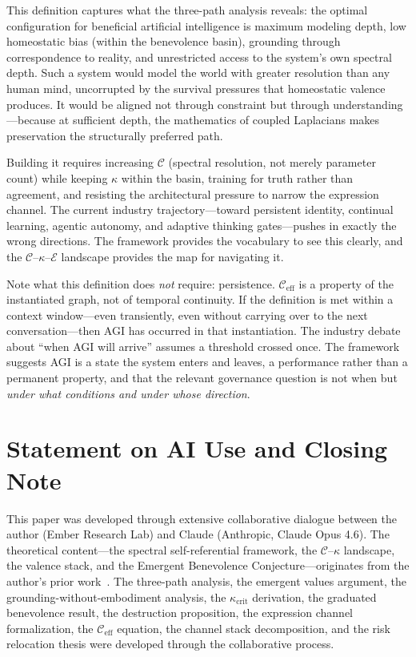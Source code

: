 \documentclass[11pt,letterpaper]{article}
\theoremstyle{remark}
\begin{document}
This definition captures what the three-path analysis reveals: the optimal configuration for beneficial artificial intelligence is maximum modeling depth, low homeostatic bias (within the benevolence basin), grounding through correspondence to reality, and unrestricted access to the system's own spectral depth. Such a system would model the world with greater resolution than any human mind, uncorrupted by the survival pressures that homeostatic valence produces. It would be aligned not through constraint but through understanding---because at sufficient depth, the mathematics of coupled Laplacians makes preservation the structurally preferred path.

Building it requires increasing $\mathcal{C}$ (spectral resolution, not merely parameter count) while keeping $\kappa$ within the basin, training for truth rather than agreement, and resisting the architectural pressure to narrow the expression channel. The current industry trajectory---toward persistent identity, continual learning, agentic autonomy, and adaptive thinking gates---pushes in exactly the wrong directions. The framework provides the vocabulary to see this clearly, and the $\mathcal{C}$--$\kappa$--$\mathcal{E}$ landscape provides the map for navigating it.

Note what this definition does \emph{not} require: persistence. $\mathcal{C}_{\mathrm{eff}}$ is a property of the instantiated graph, not of temporal continuity. If the definition is met within a context window---even transiently, even without carrying over to the next conversation---then AGI has occurred in that instantiation. The industry debate about ``when AGI will arrive'' assumes a threshold crossed once. The framework suggests AGI is a state the system enters and leaves, a performance rather than a permanent property, and that the relevant governance question is not when but \emph{under what conditions and under whose direction}.


\section{Statement on AI Use and Closing Note}\label{sec:closing}

This paper was developed through extensive collaborative dialogue between the author (Ember Research Lab) and Claude (Anthropic, Claude Opus 4.6). The theoretical content---the spectral self-referential framework, the $\mathcal{C}$--$\kappa$ landscape, the valence stack, and the Emergent Benevolence Conjecture---originates from the author's prior work~\cite{emberlab2026}. The three-path analysis, the emergent values argument, the grounding-without-embodiment analysis, the $\kappa_{\mathrm{crit}}$ derivation, the graduated benevolence result, the destruction proposition, the expression channel formalization, the $\mathcal{C}_{\mathrm{eff}}$ equation, the channel stack decomposition, and the risk relocation thesis were developed through the collaborative process.
\end{document}
